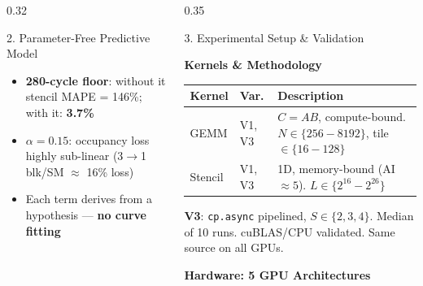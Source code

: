 \documentclass[final]{beamer}
\newcommand{\cpasync}{\texttt{cp.async}}
\begin{document}
\begin{frame}[t]
\begin{columns}[T]
\begin{column}{0.32\textwidth}
\begin{block}{2. Parameter-Free Predictive Model}
\vspace{6pt}
\begin{itemize}\setlength{\itemsep}{4pt}
  \item \textbf{280-cycle floor}: without it stencil MAPE = 146\%; with it: \textbf{3.7\%}
  \item \textbf{$\alpha{=}0.15$}: occupancy loss highly sub-linear (3$\to$1 blk/SM $\approx$ 16\% loss)
  \item Each term derives from a hypothesis --- \textbf{no curve fitting}
\end{itemize}
\end{block}

\end{column}

\begin{column}{0.35\textwidth}

\begin{block}{3. Experimental Setup \& Validation}

\textbf{\Large Kernels \& Methodology}

\vspace{4pt}
\renewcommand{\arraystretch}{1.3}
\begin{tabular}{@{}llp{9cm}@{}}
\toprule
\textbf{Kernel} & \textbf{Var.} & \textbf{Description} \\
\midrule
GEMM & V1, V3 & $C = AB$, compute-bound. $N{\in}\{256{-}8192\}$, tile ${\in}\{16{-}128\}$ \\
Stencil & V1, V3 & 1D, memory-bound (AI${\approx}5$). $L{\in}\{2^{16}{-}2^{26}\}$ \\
\bottomrule
\end{tabular}
\vspace{4pt}

\textbf{V3}: \cpasync{} pipelined, $S \in \{2,3,4\}$.
Median of 10 runs. cuBLAS/CPU validated. Same source on all GPUs.

\vspace{8pt}
\textbf{\Large Hardware: 5 GPU Architectures}


\end{block}
\end{column}
\end{columns}
\end{frame}
\end{document}
